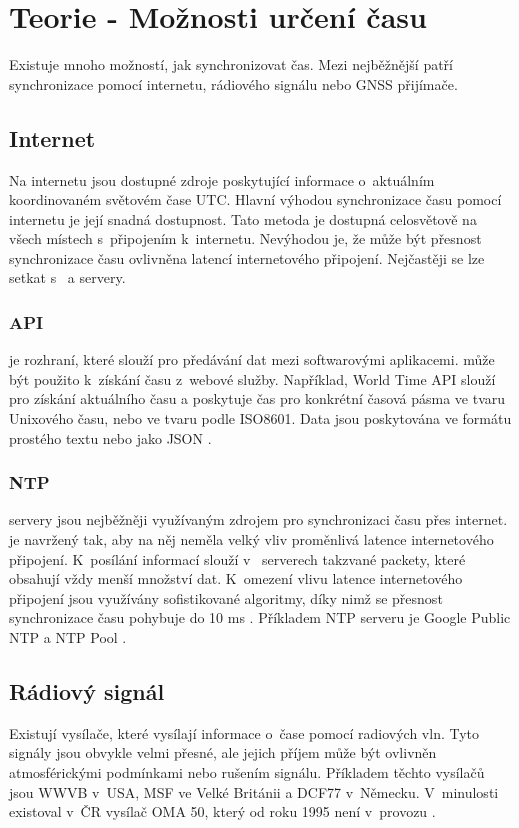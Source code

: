 \chapter{Teorie - Možnosti určení času}
\label{4-teorie-urceni-casu}
Existuje mnoho možností, jak synchronizovat čas. Mezi nejběžnější patří synchronizace pomocí internetu, rádiového signálu nebo GNSS přijímače.

\section{Internet}
Na internetu jsou dostupné zdroje poskytující informace o~aktuálním koordinovaném světovém čase UTC. Hlavní výhodou synchronizace času pomocí internetu je její snadná dostupnost. Tato metoda je dostupná celosvětově na všech místech s~připojením k~internetu. Nevýhodou je, že může být přesnost synchronizace času ovlivněna latencí internetového připojení. Nejčastěji se lze setkat s~ a  servery.

\subsection{API}
 je rozhraní, které slouží pro předávání dat mezi softwarovými aplikacemi.
 může být použito k~získání času z~webové služby. Například, World Time API slouží pro získání aktuálního času a poskytuje čas pro konkrétní časová pásma ve tvaru Unixového času, nebo ve tvaru podle ISO8601. Data jsou poskytována ve formátu prostého textu nebo jako JSON \cite{worldtimeapi}.

\subsection{NTP}
 servery jsou nejběžněji využívaným zdrojem pro synchronizaci času přes internet.  je navržený tak, aby na něj neměla velký vliv proměnlivá latence internetového připojení. K~posílání informací slouží v~ serverech takzvané packety, které obsahují vždy menší množství dat. K~omezení vlivu latence internetového připojení jsou využívány sofistikované algoritmy, díky nimž se přesnost synchronizace času pohybuje do 10 ms \cite{timetools}. Příkladem NTP serveru je Google Public NTP a NTP Pool \cite{ntppool}.

\section{Rádiový signál}
Existují vysílače, které vysílají informace o~čase pomocí radiových vln. Tyto signály jsou obvykle velmi přesné, ale jejich příjem může být ovlivněn atmosférickými podmínkami nebo rušením signálu. Příkladem těchto vysílačů jsou WWVB v~USA, MSF ve Velké Británii a DCF77 v~Německu. V~minulosti existoval v~ČR vysílač OMA 50, který od roku 1995 není v~provozu \cite{vyvoj_hw_poupa}.%

